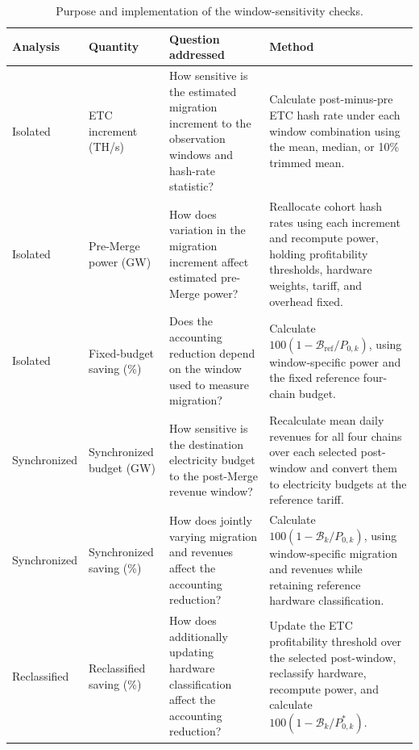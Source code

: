 \begin{table}[H]\centering
\small
\renewcommand{\arraystretch}{1.15}
\caption{Purpose and implementation of the window-sensitivity checks.}
\label{tab:window_sensitivity_methods}

\begin{tabularx}{\textwidth}{
@{}
>{\raggedright\arraybackslash}p{2.3cm}
>{\raggedright\arraybackslash}p{2.8cm}
>{\raggedright\arraybackslash}X
>{\raggedright\arraybackslash}X
@{}
}
\toprule
Analysis & Quantity & Question addressed & Method \\
\midrule

Isolated
& ETC increment (TH/s)
& How sensitive is the estimated migration increment
to the observation windows and hash-rate statistic?
& Calculate post-minus-pre ETC hash rate under each
window combination using the mean, median, or
10\% trimmed mean. \\

Isolated
& Pre-Merge power (GW)
& How does variation in the migration increment
affect estimated pre-Merge power?
& Reallocate cohort hash rates using each increment
and recompute power, holding profitability thresholds,
hardware weights, tariff, and overhead fixed. \\

Isolated
& Fixed-budget saving (\%)
& Does the accounting reduction depend on the
window used to measure migration?
& Calculate $100(1-\mathcal B_{\mathrm{ref}}/P_{0,k})$,
using window-specific power and the fixed
reference four-chain budget. \\

Synchronized
& Synchronized budget (GW)
& How sensitive is the destination electricity budget
to the post-Merge revenue window?
& Recalculate mean daily revenues for all four chains
over each selected post-window and convert them
to electricity budgets at the reference tariff. \\

Synchronized
& Synchronized saving (\%)
& How does jointly varying migration and revenues
affect the accounting reduction?
& Calculate $100(1-\mathcal B_k/P_{0,k})$,
using window-specific migration and revenues
while retaining reference hardware classification. \\

Reclassified
& Reclassified saving (\%)
& How does additionally updating hardware
classification affect the accounting reduction?
& Update the ETC profitability threshold over
the selected post-window, reclassify hardware,
recompute power, and calculate
$100(1-\mathcal B_k/P^{*}_{0,k})$. \\


\end{tabularx}
\end{table}
